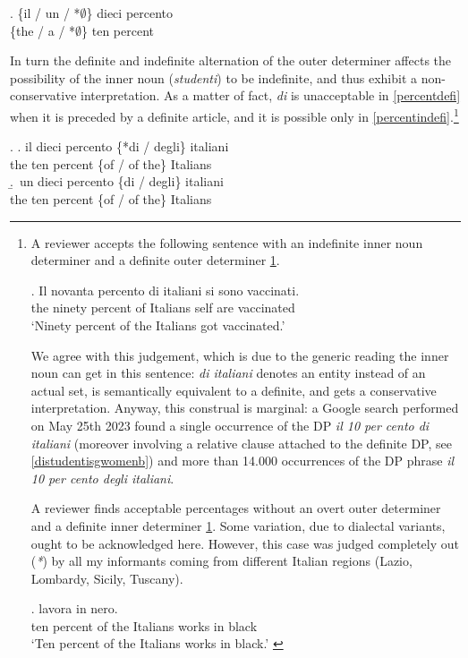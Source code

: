 \documentclass[charis, linguex]{glossa}
\begin{document}
\ex. \gll \{il / un / *$\emptyset$\} dieci percento  \\ 
      \{the / a / *$\emptyset$\} ten percent \\ \label{definiteart}


In turn the definite and indefinite alternation of the outer determiner affects the possibility of the inner noun (\textit{studenti}) to be indefinite, and thus exhibit a non-conservative interpretation. As a matter of fact, \textit{di} is unacceptable in \ref{percentdefi} when it is preceded by a definite article, and it is possible only in \ref{percentindefi}.\footnote{\label{novanta}A reviewer accepts the following sentence with an indefinite inner noun determiner and a definite outer determiner \ref{prozent3}.

\ex. 	\gll Il novanta percento di italiani si sono vaccinati. \\
                  the ninety percent of Italians self are vaccinated \\
          \glt `Ninety percent of the Italians got vaccinated.'  \label{prozent3}

We agree with this judgement, which is due to the generic reading the inner noun can get in this sentence: \textit{di italiani} denotes an entity instead of an actual set, is semantically equivalent to a definite, and gets a conservative interpretation. Anyway, this construal is marginal: a Google search performed on May 25th 2023 found a single occurrence of the DP \textit{il 10 per cento di italiani} (moreover involving a relative clause attached to the definite DP, see \ref{distudentisgwomenb}) and more than 14.000 occurrences of the DP phrase \textit{il 10 per cento degli italiani}.

A reviewer finds acceptable percentages without an overt outer determiner and a definite inner determiner \ref{neroo}. Some variation, due to dialectal variants, ought to be acknowledged here. However, this case was judged completely out (\textit{*}) by all my informants coming from different Italian regions (Lazio, Lombardy, Sicily, Tuscany).

\ex.  lavora in nero. \\
               ten percent {of the} Italians works in black \\
            \glt `Ten percent of the Italians works in black.'	\label{neroo}	
		  
		}

\ex. \a.  \gll il dieci percento \{*di / degli\} italiani \\
      the ten percent \{of / {of the}\} Italians \\ \label{percentdefi}
    \b.\ \gll un dieci percento \{di / degli\} italiani \\
      the ten percent \{of / {of the}\} Italians \\ \label{percentindefi}
\end{document}
